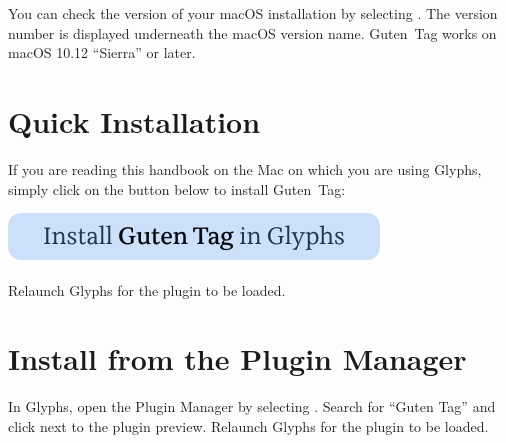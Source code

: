 You can check the version of your macOS installation by selecting .
The version number is displayed underneath the macOS version name.
Guten~Tag works on macOS 10.12 \enquote{Sierra} or later.

\section{Quick Installation}%
\label{sec:quick_installation}

If you are reading this handbook on the Mac on which you are using Glyphs, simply click on the button below to install Guten~Tag:

\bigbreak\noindent%
\href{https://florianpircher.com/glyphs/plugins/guten-tag/install}{%
  \includegraphics{Images/Install Guten Tag in Glyphs.pdf}}

\bigbreak\noindent Relaunch Glyphs for the plugin to be loaded.

\section{Install from the Plugin Manager}%
\label{sec:install_from_the_plugin_manager}

In Glyphs, open the Plugin Manager by selecting .
Search for \enquote{Guten Tag} and click  next to the plugin preview.
Relaunch Glyphs for the plugin to be loaded.

\bigbreak\noindent{}
